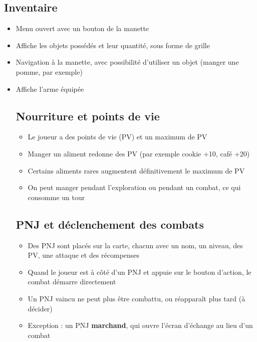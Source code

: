 \documentclass[11pt,a4paper]{article}
\begin{document}
\subsection{Inventaire}
\begin{itemize}
    \item Menu ouvert avec un bouton de la manette
    \item Affiche les objets possédés et leur quantité, sous forme de grille
    \item Navigation à la manette, avec possibilité d'utiliser un objet (manger une pomme, par exemple)
    \item Affiche l'arme équipée

\subsection{Nourriture et points de vie}
\begin{itemize}
    \item Le joueur a des points de vie (PV) et un maximum de PV
    \item Manger un aliment redonne des PV (par exemple cookie +10, café +20)
    \item Certains aliments rares augmentent définitivement le maximum de PV
    \item On peut manger pendant l'exploration ou pendant un combat, ce qui consomme un tour
\end{itemize}

\subsection{PNJ et déclenchement des combats}
\begin{itemize}
    \item Des PNJ sont placés sur la carte, chacun avec un nom, un niveau, des PV, une attaque et des récompenses
    \item Quand le joueur est à côté d'un PNJ et appuie sur le bouton d'action, le combat démarre directement
    \item Un PNJ vaincu ne peut plus être combattu, ou réapparaît plus tard (à décider)
    \item Exception : un PNJ \textbf{marchand}, qui ouvre l'écran d'échange au lieu d'un combat
\end{itemize}


\end{itemize}
\end{document}
